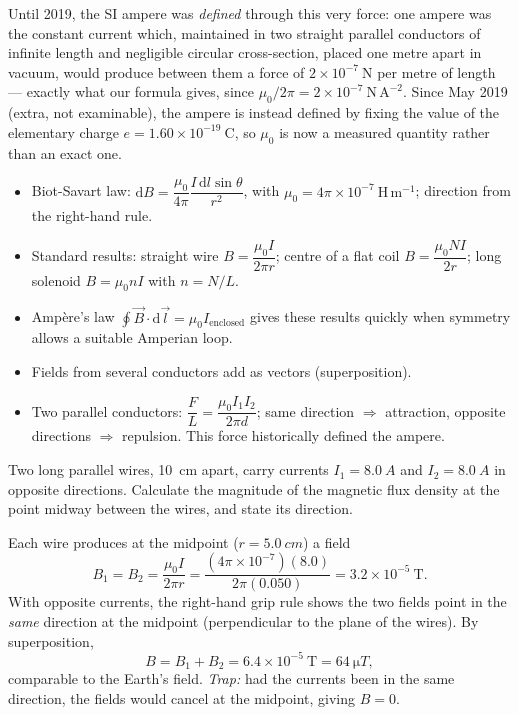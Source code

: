\documentclass[11pt]{article}
\begin{document}
\begin{savaistu}
Until 2019, the SI ampere was \emph{defined} through this very force: one ampere was the constant current which, maintained in two straight parallel conductors of infinite length and negligible circular cross-section, placed one metre apart in vacuum, would produce between them a force of $2\times 10^{-7}\ \mathrm{N}$ per metre of length — exactly what our formula gives, since $\mu_0/2\pi = 2\times 10^{-7}\ \mathrm{N\,A^{-2}}$. Since May 2019 (extra, not examinable), the ampere is instead defined by fixing the value of the elementary charge $e = 1.60\times 10^{-19}\ \mathrm{C}$, so $\mu_0$ is now a measured quantity rather than an exact one.
\end{savaistu}

\begin{aretenir}
\begin{itemize}
\item Biot-Savart law: $\mathrm{d}B = \dfrac{\mu_0}{4\pi}\dfrac{I\,\mathrm{d}l\sin\theta}{r^{2}}$, with $\mu_0 = 4\pi\times 10^{-7}\ \mathrm{H\,m^{-1}}$; direction from the right-hand rule.
\item Standard results: straight wire $B = \dfrac{\mu_0 I}{2\pi r}$; centre of a flat coil $B = \dfrac{\mu_0 N I}{2r}$; long solenoid $B = \mu_0 n I$ with $n = N/L$.
\item Ampère's law $\oint\vec{B}\cdot\mathrm{d}\vec{l} = \mu_0 I_{\text{enclosed}}$ gives these results quickly when symmetry allows a suitable Amperian loop.
\item Fields from several conductors add as vectors (superposition).
\item Two parallel conductors: $\dfrac{F}{L} = \dfrac{\mu_0 I_1 I_2}{2\pi d}$; same direction $\Rightarrow$ attraction, opposite directions $\Rightarrow$ repulsion. This force historically defined the ampere.
\end{itemize}
\end{aretenir}

\begin{exercice}
Two long parallel wires, \SI{10}{cm} apart, carry currents $I_1 = \SI{8.0}{A}$ and $I_2 = \SI{8.0}{A}$ in opposite directions. Calculate the magnitude of the magnetic flux density at the point midway between the wires, and state its direction.
\end{exercice}

\begin{corrige}[Exercise 1]
Each wire produces at the midpoint ($r = \SI{5.0}{cm}$) a field
\[ B_1 = B_2 = \frac{\mu_0 I}{2\pi r} = \frac{(4\pi\times 10^{-7})(8.0)}{2\pi(0.050)} = 3.2\times 10^{-5}\ \mathrm{T}. \]
With opposite currents, the right-hand grip rule shows the two fields point in the \emph{same} direction at the midpoint (perpendicular to the plane of the wires). By superposition,
\[ B = B_1 + B_2 = 6.4\times 10^{-5}\ \mathrm{T} = \SI{64}{\micro T}, \]
comparable to the Earth's field. \emph{Trap:} had the currents been in the same direction, the fields would cancel at the midpoint, giving $B = 0$.
\end{corrige}
\end{document}
